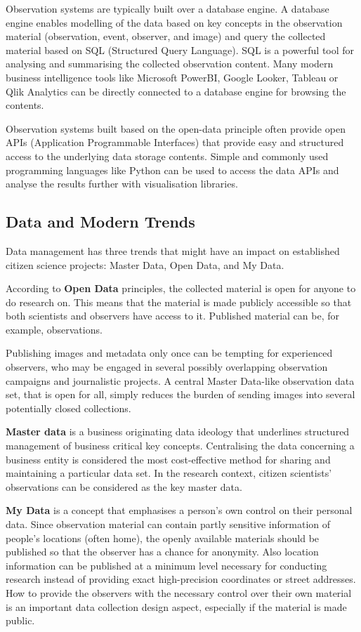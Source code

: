 \documentclass{article}
\begin{document}
Observation systems are typically built over a database engine. A database engine enables modelling of the data based on key concepts in the observation material (observation, event, observer, and image) and query the collected material based on SQL (Structured Query Language). SQL is a powerful tool for analysing and summarising the collected observation content. Many modern business intelligence tools like Microsoft PowerBI, Google Looker, Tableau or Qlik Analytics can be directly connected to a database engine for browsing the contents. 

Observation systems built based on the open-data principle often provide open APIs (Application Programmable Interfaces) that provide easy and structured access to the underlying data storage contents. Simple and commonly used programming languages like Python can be used to access the data APIs and analyse the results further with visualisation libraries.   

\subsection{Data and Modern Trends}\label{data_trend}

Data management has three trends that might have an impact on established citizen science projects: Master Data, Open Data, and My Data.

According to \textbf{Open Data} principles, the collected material is open for anyone to do research on. This means that the material is made publicly accessible so that both scientists and observers have access to it. Published material can be, for example, observations. 

Publishing images and metadata only once can be tempting for experienced observers, who may be engaged in several possibly overlapping observation campaigns and journalistic projects. A central Master Data-like observation data set, that is open for all, simply reduces the burden of sending images into several potentially closed collections. 

\textbf{Master data} is a business originating data ideology that underlines structured management of business critical key concepts. Centralising the data concerning a business entity is considered the most cost-effective method for sharing and maintaining a particular data set. In the research context, citizen scientists' observations can be considered as the key master data.

\textbf{My Data} is a concept that emphasises a person's own control on their personal data. Since observation material can contain partly sensitive information of people's locations (often home), the openly available materials should be published so that the observer has a chance for anonymity. Also location information can be published at a minimum level necessary for conducting research instead of providing exact high-precision coordinates or street addresses. How to provide the observers with the necessary control over their own material is an important data collection design aspect, especially if the material is made public.
\end{document}
